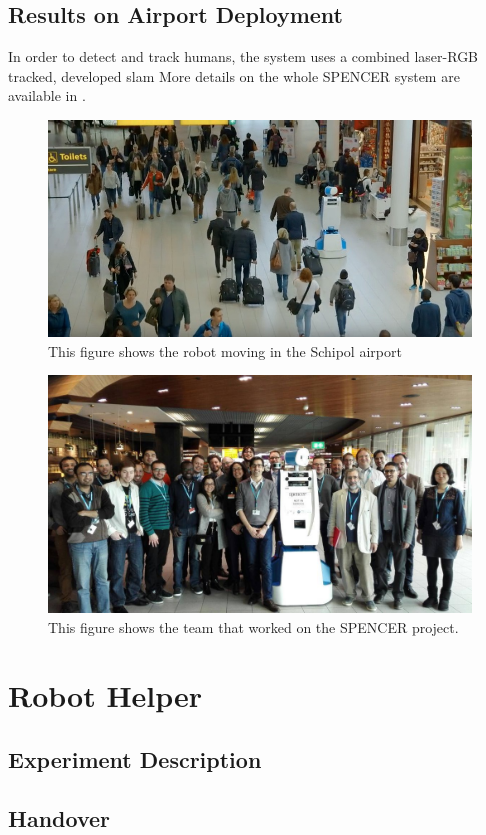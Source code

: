 \subsection{Results on Airport Deployment}
In order to detect and track humans, the system uses a combined laser-RGB tracked, developed \cite{lindermulti}
\cite{kucner2015ndt} slam
\cite{palmierirrt}
\cite{okallearning}
More details on the whole SPENCER system are available in \cite{triebel2015spencer}.


\begin{figure}[ht!]
	\centering
	\includegraphics[scale=0.45]{img/case_study/spencer/spencer_schiphol.png}
	\caption{This figure shows the robot moving in the Schipol airport}
	\label{fig:case_study-spencer-spencer_moving}
\end{figure}


\begin{figure}[ht!]
	\centering
	\includegraphics[scale=0.45]{img/case_study/spencer/all.jpg}
	\caption{This figure shows the team that worked on the SPENCER project.}
	\label{fig:case_study-spencer-team}
\end{figure}



\section{Robot Helper}
\subsection{Experiment Description}
\subsection{Handover}




